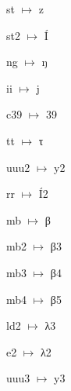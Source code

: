 {\noindent st $\mapsto$ z\par
\noindent st2 $\mapsto$ Í\par
\noindent ng $\mapsto$ ŋ\par
\noindent ii $\mapsto$ j\par
\noindent c39 $\mapsto$ 39\par
\noindent tt $\mapsto$ τ\par
\noindent uuu2 $\mapsto$ y2\par
\noindent rr $\mapsto$ Í2\par
\noindent mb $\mapsto$ β\par
\noindent mb2 $\mapsto$ β3\par
\noindent mb3 $\mapsto$ β4\par
\noindent mb4 $\mapsto$ β5\par
\noindent ld2 $\mapsto$ λ3\par
\noindent e2 $\mapsto$ λ2\par
\noindent uuu3 $\mapsto$ y3\par
}